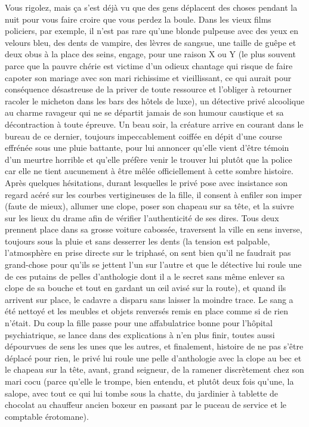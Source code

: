 Vous rigolez, mais ça s’est déjà vu que des gens déplacent des choses pendant la nuit pour vous faire croire que vous perdez la boule. Dans les vieux films policiers, par exemple, il n’est pas rare qu’une blonde pulpeuse avec des yeux en velours bleu, des dents de vampire, des lèvres de sangsue, une taille de guêpe et deux obus à la place des seins, engage, pour une raison X ou Y (le plus souvent parce que la pauvre chérie est victime d’un odieux chantage qui risque de faire capoter son mariage avec son mari richissime et vieillissant, ce qui aurait pour conséquence désastreuse de la priver de toute ressource et l’obliger à retourner racoler le micheton dans les bars des hôtels de luxe), un détective privé alcoolique au charme ravageur qui ne se départit jamais de son humour caustique et sa décontraction à toute épreuve. Un beau soir, la créature arrive en courant dans le bureau de ce dernier, toujours impeccablement coiffée en dépit d’une course effrénée sous une pluie battante, pour lui annoncer qu’elle vient d’être témoin d’un meurtre horrible et qu’elle préfère venir le trouver lui plutôt que la police car elle ne tient aucunement à être mêlée officiellement à cette sombre histoire. Après quelques hésitations, durant lesquelles le privé pose avec insistance son regard acéré sur les courbes vertigineuses de la fille, il consent à enfiler son imper (faute de mieux), allumer une clope, poser son chapeau sur sa tête, et la suivre sur les lieux du drame afin de vérifier l’authenticité de ses dires. Tous deux prennent place dans sa grosse voiture cabossée, traversent la ville en sens inverse, toujours sous la pluie et sans desserrer les dents (la tension est palpable, l’atmosphère en prise directe sur le triphasé, on sent bien qu’il ne faudrait pas grand-chose pour qu’ils se jettent l’un sur l’autre et que le détective lui roule une de ces putains de pelles d’anthologie dont il a le secret sans même enlever sa clope de sa bouche et tout en gardant un œil avisé sur la route), et quand ils arrivent sur place, le cadavre a disparu sans laisser la moindre trace. Le sang a été nettoyé et les meubles et objets renversés remis en place comme si de rien n’était. Du coup la fille passe pour une affabulatrice bonne pour l’hôpital psychiatrique, se lance dans des explications à n’en plus finir, toutes aussi dépourvues de sens les unes que les autres, et finalement, histoire de ne pas s’être déplacé pour rien, le privé lui roule une pelle d’anthologie avec la clope au bec et le chapeau sur la tête, avant, grand seigneur, de la ramener discrètement chez son mari cocu (parce qu’elle le trompe, bien entendu, et plutôt deux fois qu’une, la salope, avec tout ce qui lui tombe sous la chatte, du jardinier à tablette de chocolat au chauffeur ancien boxeur en passant par le puceau de service et le comptable érotomane).

